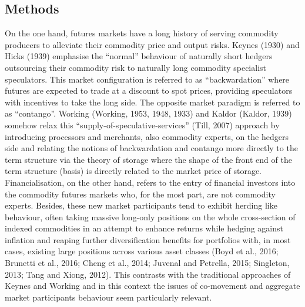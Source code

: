 \documentclass[]{elsarticle} %
\begin{document}
\hypertarget{co-movement-methods}{%
\subsection{Methods}\label{co-movement-methods}}

On the one hand, futures markets have a long history of serving commodity producers to alleviate their commodity price and output risks. Keynes (1930) and Hicks (1939) emphasise the ``normal'' behaviour of naturally short hedgers outsourcing their commodity risk to naturally long commodity specialist speculators. This market configuration is referred to as ``backwardation'' where futures are expected to trade at a discount to spot prices, providing speculators with incentives to take the long side. The opposite market paradigm is referred to as ``contango''. Working (Working, 1953, 1948, 1933) and Kaldor (Kaldor, 1939) somehow relax this ``supply-of-speculative-services'' (Till, 2007) approach by introducing processors and merchants, also commodity experts, on the hedgers side and relating the notions of backwardation and contango more directly to the term structure via the theory of storage where the shape of the front end of the term structure (basis) is directly related to the market price of storage.\\
Financialisation, on the other hand, refers to the entry of financial investors into the commodity futures markets who, for the most part, are not commodity experts. Besides, these new market participants tend to exhibit herding like behaviour, often taking massive long-only positions on the whole cross-section of indexed commodities in an attempt to enhance returns while hedging against inflation and reaping further diversification benefits for portfolios with, in most cases, existing large positions across various asset classes (Boyd et al., 2016; Brunetti et al., 2016; Cheng et al., 2014; Juvenal and Petrella, 2015; Singleton, 2013; Tang and Xiong, 2012). This contrasts with the traditional approaches of Keynes and Working and in this context the issues of co-movement and aggregate market participants behaviour seem particularly relevant.

\medskip\setlength{\parindent}{0pt}
\end{document}
